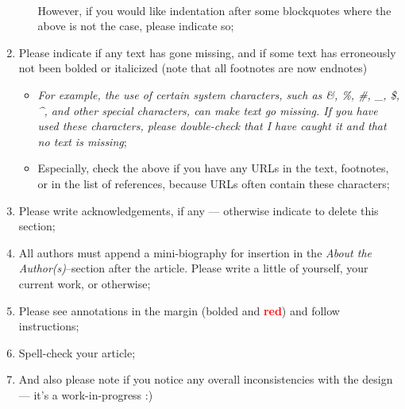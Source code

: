 \begin{enumerate}
\begin{enumerate}
        \\However, if you would like indentation after some blockquotes where the above is not the case, please indicate so;
        \end{enumerate}
    \item Please indicate if any text has gone missing, and if some text has erroneously not been bolded or italicized (note that all footnotes are now endnotes)
        \begin{itemize}
        \item \textit{For example, the use of certain system characters, such as \&, \%, \#, \_, \$, \^{}, and other special characters, can make text go missing. If you have used these characters, please double-check that I have caught it and that no text is missing};
        \item Especially, check the above if you have any URLs in the text, footnotes, or in the list of references, because URLs often contain these characters;
        \end{itemize}
    \item Please write acknowledgements, if any --- otherwise indicate to delete this section;
    \item All authors must append a mini-biography for insertion in the \textit{About the Author(s)}--section after the article. Please write a little of yourself, your current work, or otherwise;
    \item Please see annotations in the margin (bolded and \textcolor{red}{\textbf{red}}) and follow instructions;
    \item Spell-check your article;
    \item And also please note if you notice any overall inconsistencies with the design --- it's a work-in-progress :) \textellipsis
\end{enumerate}